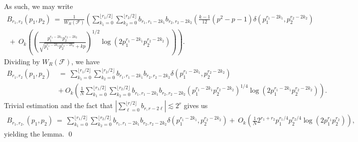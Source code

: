 \documentclass[11pt, reqno]{amsart}
\theoremstyle{definition}
\theoremstyle{remark}
\numberwithin{equation}{section}
\begin{document}
As such, we may write
\begin{align}
  B_{r_1,r_2}(p_1, p_2)\ =\ \frac{1}{W_R(\mathcal{F})} \left(\sum_{k_1=0}^{\lfloor r_1/2 \rfloor}\sum_{k_2=0}^{\lfloor r_2/2 \rfloor} b_{r_1, r_1-2k_1}b_{r_2, r_2-2k_2}\left(\frac{k-1}{12}(p^2-p-1)\delta\left(p_1^{r_1-2k_1}, p_2^{r_2-2k_2}\right) \right. \right. \nonumber\\ \left. \ + \ O_k\left(\left(\frac{p_1^{r_1-2k_1}p_2^{r_2-2k_2}}{\sqrt{p_1^{r_1-2k_1}p_2^{r_2-2k_2}}+kp}\right)^{1/2}\log\left(2p_1^{r_1-2k_1}p_2^{r_2-2k_2}\right)\right) \right).
\end{align}
Dividing by $W_R(\mathcal{F})$, we have
\begin{align*}
    B_{r_1,r_2}(p_1, p_2)\ &=\ \sum_{k_1=0}^{\lfloor r_1/2 \rfloor}\sum_{k_2=0}^{\lfloor r_2/2 \rfloor} b_{r_1, r_1-2k_1}b_{r_2, r_2-2k_2}\delta(p_1^{r_1-2k_1}, p_2^{r_2-2k_2}) \\ &+ \ O_k\left(\frac{1}{N} \sum_{k_1=0}^{\lfloor r_1/2 \rfloor}\sum_{k_2=0}^{\lfloor r_2/2 \rfloor} b_{r_1, r_1-2k_1}b_{r_2, r_2-2k_2}\left({p_1^{r_1-2k_1}p_2^{r_2-2k_2}}\right)^{1/4}\log\left(2p_1^{r_1-2k_1}p_2^{r_2-2k_2}\right)\right).
\end{align*}
Trivial estimation and the fact that $|\sum_{\ell=0}^{\lfloor r/2\rfloor}b_{r,r-2\ell}|\lesssim2^{r}$ gives us
\begin{align*}
    B_{r_1,r_2,}(p_1, p_2)\ = \ \sum_{k_1=0}^{\lfloor r_1/2 \rfloor}\sum_{k_2=0}^{\lfloor r_2/2 \rfloor} b_{r_1, r_1-2k_1}b_{r_2, r_2-2k_2}\delta(p_1^{r_1-2k_1}, p_2^{r_2-2k_2})+ \ O_k\left(\frac{1}{N} 2^{r_1+r_2}{p_1^{r_1/4}p_2^{r_2/4}}\log\left(2p_1^{r_1}p_2^{r_2}\right)\right),
\end{align*}
yielding the lemma. \qed
\end{document}
